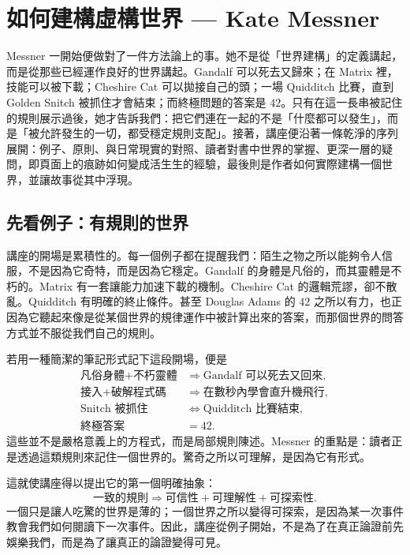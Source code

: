 \chapter{如何建構虛構世界 --- Kate Messner}

Messner 一開始便做對了一件方法論上的事。她不是從「世界建構」的定義講起，而是從那些已經運作良好的世界講起。Gandalf 可以死去又歸來；在 Matrix 裡，技能可以被下載；Cheshire Cat 可以拋接自己的頭；一場 Quidditch 比賽，直到 Golden Snitch 被抓住才會結束；而終極問題的答案是 \(42\)。只有在這一長串被記住的規則展示過後，她才告訴我們：把它們連在一起的不是「什麼都可以發生」，而是「被允許發生的一切，都受穩定規則支配」。接著，講座便沿著一條乾淨的序列展開：例子、原則、與日常現實的對照、讀者對書中世界的掌握、更深一層的疑問，即頁面上的痕跡如何變成活生生的經驗，最後則是作者如何實際建構一個世界，並讓故事從其中浮現。

\section{先看例子：有規則的世界}

講座的開場是累積性的。每一個例子都在提醒我們：陌生之物之所以能夠令人信服，不是因為它奇特，而是因為它穩定。Gandalf 的身體是凡俗的，而其靈體是不朽的。Matrix 有一套讓能力加速下載的機制。Cheshire Cat 的邏輯荒謬，卻不散亂。Quidditch 有明確的終止條件。甚至 Douglas Adams 的 \(42\) 之所以有力，也正因為它聽起來像是從某個世界的規律運作中被計算出來的答案，而那個世界的問答方式並不服從我們自己的規則。

若用一種簡潔的筆記形式記下這段開場，便是
\begin{align}
\text{凡俗身體} + \text{不朽靈體} &\Rightarrow \text{Gandalf 可以死去又回來},\\
\text{接入} + \text{破解程式碼} &\Rightarrow \text{在數秒內學會直升機飛行},\\
\text{Snitch 被抓住} &\iff \text{Quidditch 比賽結束},\\
\text{終極答案} &= 42.
\end{align}
這些並不是嚴格意義上的方程式，而是局部規則陳述。Messner 的重點是：讀者正是透過這類規則來記住一個世界的。驚奇之所以可理解，是因為它有形式。

這就使講座得以提出它的第一個明確抽象：
\begin{equation}
\text{一致的規則} \Rightarrow \text{可信性} + \text{可理解性} + \text{可探索性}.
\end{equation}
一個只是讓人吃驚的世界是薄的；一個世界之所以變得可探索，是因為某一次事件教會我們如何閱讀下一次事件。因此，講座從例子開始，不是為了在真正論證前先娛樂我們，而是為了讓真正的論證變得可見。

